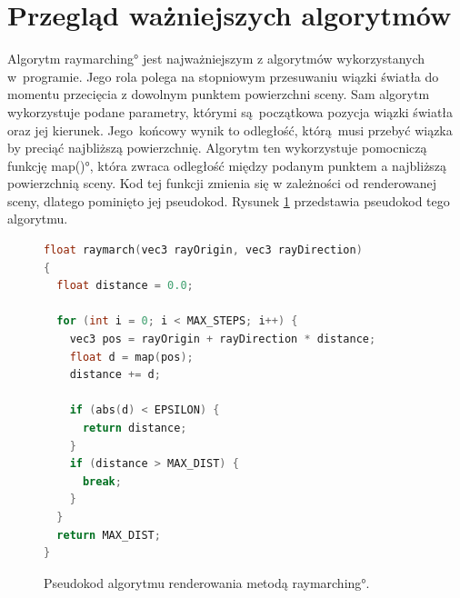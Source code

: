 \section{Przegląd ważniejszych algorytmów}

Algorytm \ang{raymarching} jest najważniejszym z algorytmów wykorzystanych w~programie. Jego rola polega na stopniowym
przesuwaniu wiązki światła do momentu przecięcia z dowolnym punktem powierzchni sceny. Sam algorytm wykorzystuje podane parametry, którymi są początkowa pozycja wiązki światła oraz jej kierunek. Jego~końcowy wynik to odległość, którą musi przebyć wiązka by preciąć najbliższą powierzchnię. Algorytm ten wykorzystuje pomocniczą funkcję
\ang{map()}, która zwraca odległość między podanym punktem a najbliższą powierzchnią sceny. Kod tej funkcji zmienia się w zależności od renderowanej sceny, dlatego pominięto jej pseudokod.
Rysunek \ref{fig:pseudokod:raymarching} przedstawia pseudokod tego algorytmu.

\begin{figure}[H]
\centering
\begin{lstlisting}[language=C]
float raymarch(vec3 rayOrigin, vec3 rayDirection)
{
  float distance = 0.0;

  for (int i = 0; i < MAX_STEPS; i++) {
    vec3 pos = rayOrigin + rayDirection * distance;
    float d = map(pos);
    distance += d;

    if (abs(d) < EPSILON) {
      return distance;
    }
    if (distance > MAX_DIST) {
      break;
    }
  }
  return MAX_DIST;
}
\end{lstlisting}
\caption{Pseudokod algorytmu renderowania metodą \ang{raymarching}.}
\label{fig:pseudokod:raymarching}
\end{figure}

